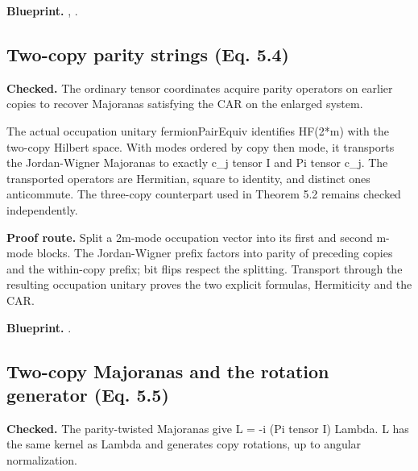 \textbf{Blueprint.} , .

\subsection{Two-copy parity strings (Eq. 5.4)}\label{paper:fermion-two-copy-majoranas}
\textbf{Checked.} The ordinary tensor coordinates acquire parity operators on earlier copies to recover Majoranas satisfying the CAR on the enlarged system. 

The actual occupation unitary fermionPairEquiv identifies HF(2*m) with the two-copy Hilbert space. With modes ordered by copy then mode, it transports the Jordan-Wigner Majoranas to exactly c\_j tensor I and Pi tensor c\_j. The transported operators are Hermitian, square to identity, and distinct ones anticommute. The three-copy counterpart used in Theorem 5.2 remains checked independently.

\textbf{Proof route.} Split a 2m-mode occupation vector into its first and second m-mode blocks. The Jordan-Wigner prefix factors into parity of preceding copies and the within-copy prefix; bit flips respect the splitting. Transport through the resulting occupation unitary proves the two explicit formulas, Hermiticity and the CAR.


\textbf{Blueprint.} .

\subsection{Two-copy Majoranas and the rotation generator (Eq. 5.5)}\label{paper:fermion-rotation}
\textbf{Checked.} The parity-twisted Majoranas give L = -i (Pi tensor I) Lambda. L has the same kernel as Lambda and generates copy rotations, up to angular normalization. 

